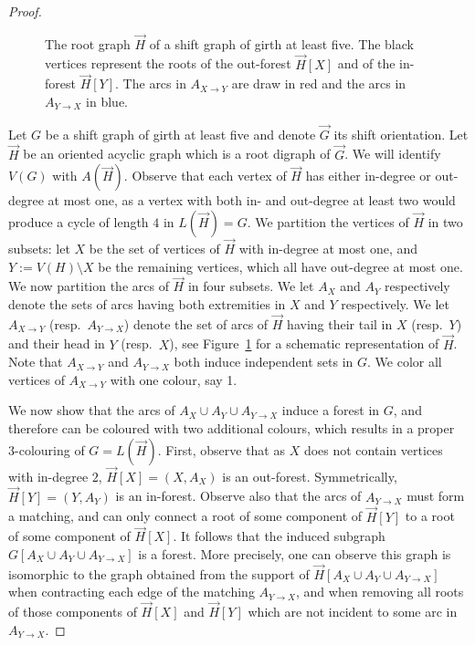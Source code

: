 \documentclass[11pt,a4aper]{article}
\DeclareRobustCommand*{\ora}{\overrightarrow}
\newcommand*{\orG}{\ora{G}}
\newcommand*{\orH}{\ora{H}}
\begin{document}
\begin{proof}
\begin{figure}[h!]
    
    \caption{The root graph $\orH$ of a shift graph of girth at least five. The
      black vertices represent the roots of the out-forest $\orH[X]$ and of the
      in-forest $\orH[Y]$. The arcs in $A_{X \to Y}$ are draw in red and the
      arcs in $A_{Y\to X}$ in blue.}\label{fig:shiftgirth5}
  \end{figure}
  Let $G$ be a shift graph of girth at least five and denote $\orG$ its shift
  orientation. Let $\orH$ be an oriented acyclic graph which is a root digraph
  of $\orG$. We will identify $V(G)$ with $A(\orH)$. Observe that each vertex of
  $\orH$ has either in-degree or out-degree at most one, as a vertex with both
  in- and out-degree at least two would produce a cycle of length $4$ in $L(\orH)=G$. We partition the vertices of $\orH$ in two subsets: let $X$ be the
  set of vertices of $\orH$ with in-degree at most one, and $Y:=V(H)\setminus X$
  be the remaining vertices, which all have out-degree at most one. We now
  partition the arcs of $\orH$ in four subsets. We let $A_X$ and $A_Y$
  respectively denote the sets of arcs having both extremities in $X$ and $Y$
  respectively. We let $A_{X\to Y}$ (resp.\ $A_{Y\to X}$) denote the set of arcs
  of $\orH$ having their tail in $X$ (resp.\ $Y$) and their head in $Y$ (resp.\
  $X$), see Figure~\ref{fig:shiftgirth5} for a schematic representation of $\orH$.  Note that
  $A_{X\to Y}$ and $A_{Y\to X}$ both induce independent sets in $G$. We color all
  vertices of $A_{X\to Y}$ with one colour, say 1.
  
  We now show that the arcs of $A_X\cup A_Y \cup A_{Y\to X}$ induce a forest in
  $G$, and therefore can be coloured with two additional colours, which results
  in a proper 3-colouring of $G=L(\orH)$.  First, observe that as $X$ does not
  contain vertices with in-degree $2$, $\orH[X]=(X,A_X)$ is an
  out-forest. Symmetrically, $\orH[Y]=(Y,A_Y)$ is an in-forest. Observe also
  that the arcs of $A_{Y\to X}$ must form a matching, and can only connect a
  root of some component of $\orH[Y]$ to a root of some component of
  $\orH[X]$. It follows that the induced subgraph
  $G[A_X\cup A_Y\cup A_{Y\to X}]$ is a forest. More precisely, one can observe
  this graph is isomorphic to the graph obtained from the support of $\orH[A_X\cup A_Y\cup A_{Y\to X}]$ when contracting each edge of
  the matching $A_{Y\to X}$, and when removing all roots of those components of
  $\orH[X]$ and $\orH[Y]$ which are not incident to some arc in $A_{Y\to X}$.
\end{proof}
\end{document}
